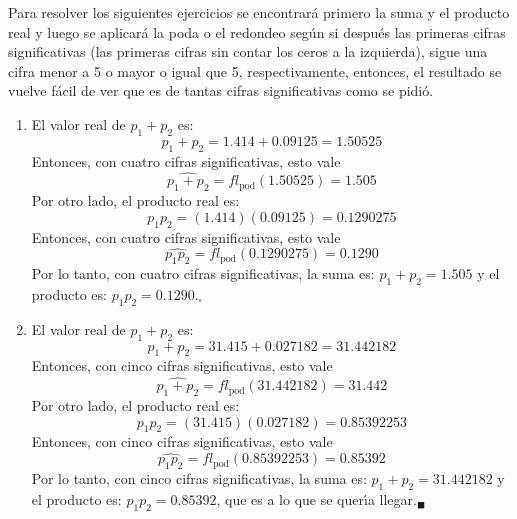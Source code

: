 \begin{solucion}
 Para resolver los siguientes ejercicios se encontrar\'a primero la suma y el producto real y luego se aplicar\'a la poda o el redondeo seg\'un si despu\'es las primeras cifras significativas (las primeras cifras sin contar los ceros a la izquierda), sigue una cifra menor a 5 o mayor o igual que 5, respectivamente, entonces, el resultado se vuelve f\'acil de ver que es de tantas cifras significativas como se pidi\'o.
 \begin{enumerate}
  \item El valor real de $p_1 + p_2$ es:
  \begin{equation*}
   p_1 + p_2 = 1.414 + 0.09125 = 1.50525
  \end{equation*}
  Entonces, con cuatro cifras significativas, esto vale
  \begin{equation*}
   \widehat{p_1 + p_2} = fl_{\text{pod}}(1.50525) = 1.505
  \end{equation*}
  Por otro lado, el producto real es:
  \begin{equation*}
   p_1p_2 = (1.414)(0.09125) = 0.1290275
  \end{equation*}
  Entonces, con cuatro cifras significativas, esto vale
  \begin{equation*}
   \widehat{p_1p_2} = fl_{\text{pod}}(0.1290275) = 0.1290
  \end{equation*}
  Por lo tanto, con cuatro cifras significativas, la suma es: $p_1 + p_2 = 1.505$ y el producto es: $p_1p_2 = 0.1290$.${}_{\square}$
  
  \item El valor real de $p_1 + p_2$ es:
  \begin{equation*}
   p_1 + p_2 = 31.415 + 0.027182 = 31.442182
  \end{equation*}
  Entonces, con cinco cifras significativas, esto vale
  \begin{equation*}
   \widehat{p_1 + p_2} = fl_{\text{pod}}(31.442182) = 31.442
  \end{equation*}
  Por otro lado, el producto real es:
  \begin{equation*}
   p_1p_2 = (31.415)(0.027182) = 0.85392253
  \end{equation*}
  Entonces, con cinco cifras significativas, esto vale
  \begin{equation*}
   \widehat{p_1p_2} = fl_{\text{pod}}(0.85392253) = 0.85392
  \end{equation*}
  Por lo tanto, con cinco cifras significativas, la suma es: $p_1 + p_2 = 31.442182$ y el producto es: $p_1p_2 = 0.85392$, que es a lo que se quer\'{\i}a llegar.${}_{\blacksquare}$
 \end{enumerate}
\end{solucion}
